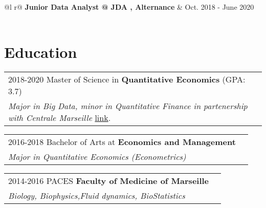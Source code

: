 \documentclass[a4paper,12pt]{article}
\begin{document}
\begin{tabularx}{\linewidth}{ @{}l r@{} }
\textbf{Junior Data Analyst @ JDA , Alternance} & \hfill Oct. 2018 - June 2020 \\[3.75pt]
\\
\end{tabularx}

\section{Education}
\begin{tabularx}{\linewidth}{@{}l X@{}}	
2018-2020 Master of Science in \textbf{Quantitative Economics} \hfill \normalsize (GPA: 3.7) \\
\textit{Major in Big Data, minor in Quantitative Finance in partenership with Centrale Marseille }
\href{https://verify.skilljar.com/c/bmbokwj42g8j}{link}.\\
\end{tabularx}


\begin{tabularx}{\linewidth}{@{}l X@{}}	
2016-2018 Bachelor of Arts at \textbf{Economics and Management} \hfill \normalsize \\
\textit{Major in Quantitative Economics (Econometrics)}
\end{tabularx}

\begin{tabularx}{\linewidth}{@{}l X@{}}	
2014-2016 PACES \textbf{Faculty of Medicine of Marseille} \hfill \normalsize \\
\textit{Biology, Biophysics,Fluid dynamics, BioStatistics}
\end{tabularx}
\end{document}

